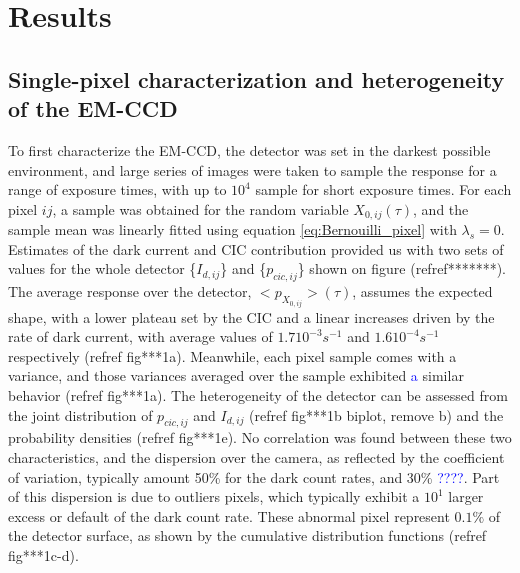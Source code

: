 \documentclass{article}
\begin{document}
\section*{Results}
\subsection*{Single-pixel characterization and heterogeneity of the EM-CCD}

To first characterize the EM-CCD, the detector was set in the darkest possible environment, and large series of images were taken to sample the response for a range of exposure times, with up to $10^4$ sample for short exposure times.
For each pixel $ij$, a sample was obtained for the random variable $X_{0,ij}(\tau)$, and the sample mean was linearly fitted using equation \eqref{eq:Bernouilli_pixel} with $\lambda_{s}=0$.
Estimates of the dark current and CIC contribution provided us with two sets of values for the whole detector \{$I_{d,ij}$\} and \{${p_{cic,ij}}$\} shown on figure (refref*******). 
The average response over the detector, $<p_{X_{0,ij}}>(\tau)$, assumes the expected shape, with a lower plateau set by the CIC and a linear increases driven by the rate of dark current, with average values of $1.7 10^{-3} s^{-1}$ and $1.6 10^{-4} s^{-1}$ respectively (refref fig***1a).
Meanwhile, each pixel sample comes with a variance, and those variances averaged over the sample exhibited \textcolor{blue}{a} similar behavior  (refref fig***1a).
The heterogeneity of the detector can be assessed from the joint distribution of $ p_{cic,ij} $ and ${I_{d,ij}}$ (refref fig***1b biplot, remove b) and the probability densities (refref fig***1e).
No correlation was found between these two characteristics, and the dispersion over the camera, as reflected by the coefficient of variation, typically amount 50\% for the dark count rates, and 30\% \textcolor{blue}{????}.
Part of this dispersion is due to outliers pixels, which typically exhibit a $10^1$ larger excess or default of the dark count rate.  
These abnormal pixel represent $0.1\%$ of the detector surface, as shown by the cumulative distribution functions (refref fig***1c-d).  
\end{document}
